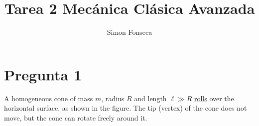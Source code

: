 \documentclass[]{article}
\title{Tarea 2 Mecánica Clásica Avanzada}
\author{Simon Fonseca}
\numberwithin{equation}{section}
\newcommand{\0}{\textcolor{gray}{0}}
\begin{document}
\maketitle
\section{Pregunta 1}
A homogeneous cone of mass \(m\), radius \(R\) and length \(\ell \gg R\) \underline{rolls} over the horizontal surface, as shown in the figure. The tip (vertex) of the cone does not move, but the cone can rotate freely around it.

\begin{figure}[h!]
	\centering
	\begin{tikzpicture}[x=0.75pt,y=0.75pt,yscale=-1,xscale=1]
		

\end{tikzpicture}
\end{figure}
\end{document}
